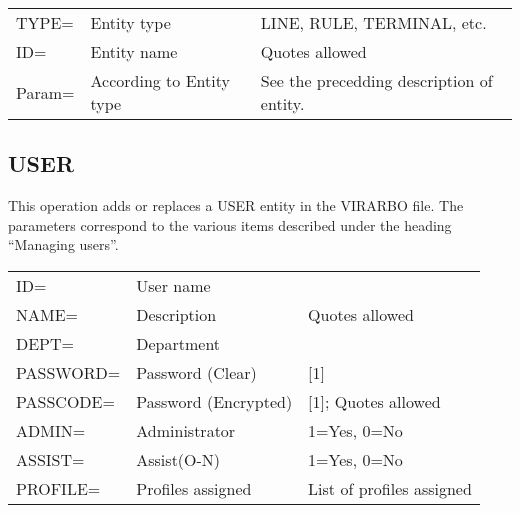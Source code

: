 \documentclass[letterpaper,10pt,english]{sphinxmanual}
\begin{document}
\begin{savenotes}\sphinxattablestart
\centering
\begin{tabulary}{\linewidth}[t]{|T|T|T|}
\hline
{}\relax &\relax &\relax \\
\hline
TYPE=
&
Entity type
&
LINE, RULE, TERMINAL, etc.
\\
\hline
ID=
&
Entity name
&
Quotes allowed
\\
\hline
Param=
&
According to Entity type
&
See the precedding description of entity.
\\
\hline
\end{tabulary}
\par
\sphinxattableend\end{savenotes}


\subsection{USER}
\label{\detokenize{Installation_Guide:index-176}}\label{\detokenize{Installation_Guide:user}}
This operation adds or replaces a USER entity in the VIRARBO file. The parameters correspond to the various items described under the heading “Managing users”.


\begin{savenotes}\sphinxattablestart
\centering
\begin{tabulary}{\linewidth}[t]{|T|T|T|}
\hline
{}\relax &\relax &\relax \\
\hline
ID=
&
User name
&\\
\hline
NAME=
&
Description
&
Quotes allowed
\\
\hline
DEPT=
&
Department
&\\
\hline
PASSWORD=
&
Password (Clear)
&
{[}1{]}
\\
\hline
PASSCODE=
&
Password (Encrypted)
&
{[}1{]}; Quotes allowed
\\
\hline
ADMIN=
&
Administrator
&
1=Yes, 0=No
\\
\hline
ASSIST=
&
Assist(O-N)
&
1=Yes, 0=No
\\
\hline
PROFILE=
&
Profiles assigned
&
List of profiles assigned
\\
\hline
\end{tabulary}
\par
\sphinxattableend\end{savenotes}
\end{document}
